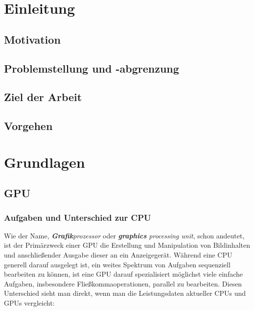 \documentclass[oneside]{ausarbeitung}
\begin{document}
\chapter{Einleitung}
\label{cha:einleitung}

\section{Motivation}
\label{sec:motivation}

\section{Problemstellung und -abgrenzung}
\label{sec:problemstellung}

\section{Ziel der Arbeit}
\label{sec:ziel}

\section{Vorgehen}
\label{sec:vorgehen}


\chapter{Grundlagen}
\label{cha:grundlagen}

\section{GPU}
\label{sec:GPU}

\subsection{Aufgaben und Unterschied zur CPU}
\label{sub:GPU_tasks}
Wie der Name, \textit{\textbf{Grafik}prozessor} oder \textit{\textbf{graphics} processing unit}, schon andeutet, ist der Primärzweck einer \ac{GPU} die Erstellung und Manipulation von Bildinhalten und anschließender Ausgabe dieser an ein Anzeigegerät. Während eine \ac{CPU} generell darauf ausgelegt ist, ein weites Spektrum von Aufgaben sequenziell bearbeiten zu können, ist eine \ac{GPU} darauf spezialisiert möglichst viele einfache Aufgaben, insbesondere Fließkommaoperationen, parallel zu bearbeiten. Diesen Unterschied sieht man direkt, wenn man die Leistungsdaten aktueller \ac{CPU}s und \ac{GPU}s vergleicht:
\end{document}
